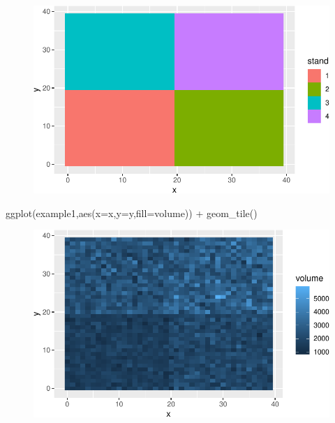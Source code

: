 \documentclass[
  letterpaper,
  DIV=11,
  numbers=noendperiod]{scrartcl}
\newenvironment{Shaded}{\begin{snugshade}}{\end{snugshade}}
\newcommand{\AttributeTok}[1]{\textcolor[rgb]{0.40,0.45,0.13}{#1}}
\newcommand{\FunctionTok}[1]{\textcolor[rgb]{0.28,0.35,0.67}{#1}}
\newcommand{\NormalTok}[1]{\textcolor[rgb]{0.00,0.23,0.31}{#1}}
\newcommand{\SpecialCharTok}[1]{\textcolor[rgb]{0.37,0.37,0.37}{#1}}
\begin{document}
\begin{figure}[H]

{\centering \includegraphics{Regression_estimator_files/figure-pdf/unnamed-chunk-1-1.pdf}

}

\end{figure}

\begin{Shaded}
\begin{Highlighting}[]
\FunctionTok{ggplot}\NormalTok{(example1,}\FunctionTok{aes}\NormalTok{(}\AttributeTok{x=}\NormalTok{x,}\AttributeTok{y=}\NormalTok{y,}\AttributeTok{fill=}\NormalTok{volume)) }\SpecialCharTok{+} \FunctionTok{geom\_tile}\NormalTok{()}
\end{Highlighting}
\end{Shaded}

\begin{figure}[H]

{\centering \includegraphics{Regression_estimator_files/figure-pdf/unnamed-chunk-1-2.pdf}

}

\end{figure}
\end{document}
